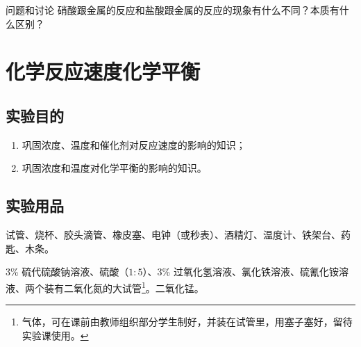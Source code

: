 \begin{Theorem}{问题和讨论}
硝酸跟金属的反应和盐酸跟金属的反应的现象有什么不同？本质有什么区别？
\end{Theorem}


\section{化学反应速度\texorpdfstring{\quad}{ }化学平衡}
\subsection*{实验目的}
\begin{enumerate}[1.]
  \item 巩固浓度、温度和催化剂对反应速度的影响的知识；
  \item 巩固浓度和温度对化学平衡的影响的知识。
\end{enumerate}
\subsection*{实验用品}
试管、烧杯、胶头滴管、橡皮塞、电钟（或秒表）、酒精灯、温度计、铁架台、药匙、木条。

3\% 硫代硫酸钠溶液、硫酸（$1:5$）、3\% 过氧化氢溶液、氯化铁溶液、硫氰化铵溶液、两个装有二氧化氮的大试管\footnote{ 气体，可在课前由教师组织部分学生制好，并装在试管里，用塞子塞好，留待实验课使用。}。二氧化锰。

